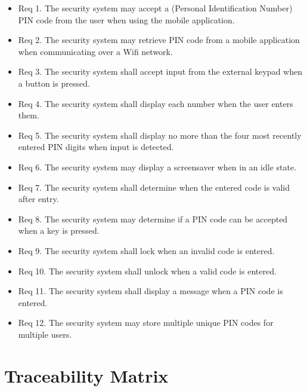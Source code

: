 \begin{itemize}
    \item Req 1. The security system may accept a (Personal Identification Number) PIN code from the user when using the mobile application.
    \item Req 2. The security system may retrieve PIN code from a mobile application when communicating over a Wifi network. 
    \item Req 3. The security system shall accept input from the external keypad when a button is pressed.
    \item Req 4. The security system shall display each number when the user enters them.
    \item Req 5. The security system shall display no more than the four most recently entered PIN digits when input is detected.
    \item Req 6. The security system may display a screensaver when in an idle state.
    \item Req 7. The security system shall determine when the entered code is valid after entry.
    \item Req 8. The security system may determine if a PIN code can be accepted when a key is pressed.
    \item Req 9. The security system shall lock when an invalid code is entered.
    \item Req 10. The security system shall unlock when a valid code is entered.
    \item Req 11. The security system shall display a message when a PIN code is entered.
    \item Req 12. The security system may store multiple unique PIN codes for multiple users.
    
\end{itemize}

\newpage \section{Traceability Matrix}

